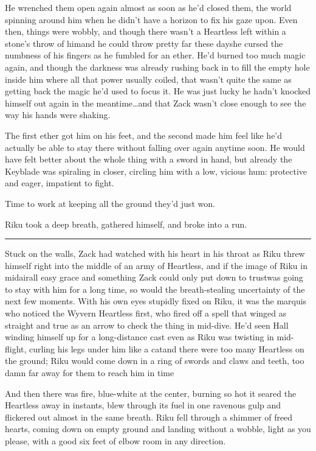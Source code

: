 He wrenched them open again almost as soon as he'd closed them, the world spinning around him when he didn't have a horizon to fix his gaze upon. Even then, things were wobbly, and though there wasn't a Heartless left within a stone's throw of him\textemdash and he could throw pretty far these days\textemdash he cursed the numbness of his fingers as he fumbled for an ether. He'd burned too much magic again, and though the darkness was already rushing back in to fill the empty hole inside him where all that power usually coiled, that wasn't quite the same as getting back the magic he'd used to focus it. He was just lucky he hadn't knocked himself out again in the meantime\ldots and that Zack wasn't close enough to see the way his hands were shaking.

The first ether got him on his feet, and the second made him feel like he'd actually be able to stay there without falling over again anytime soon. He would have felt better about the whole thing with a sword in hand, but already the Keyblade was spiraling in closer, circling him with a low, vicious hum: protective and eager, impatient to fight.

Time to work at keeping all the ground they'd just won.

Riku took a deep breath, gathered himself, and broke into a run.

\fancybreak{\pfbreakdisplay}


Stuck on the walls, Zack had watched with his heart in his throat as Riku threw himself right into the middle of an army of Heartless, and if the image of Riku in midair\textemdash all easy grace and something Zack could only put down to trust\textemdash was going to stay with him for a long time, so would the breath-stealing uncertainty of the next few moments. With his own eyes stupidly fixed on Riku, it was the marquis who noticed the Wyvern Heartless first, who fired off a spell that winged as straight and true as an arrow to check the thing in mid-dive. He'd seen Hall winding himself up for a long-distance cast even as Riku was twisting in mid-flight, curling his legs under him like a cat\textemdash and there were too many Heartless on the ground; Riku would come down in a ring of swords and claws and teeth, too damn far away for them to reach him in time\textemdash 

And then there was fire, blue-white at the center, burning so hot it seared the Heartless away in instants, blew through its fuel in one ravenous gulp and flickered out almost in the same breath. Riku fell through a shimmer of freed hearts, coming down on empty ground and landing without a wobble, light as you please, with a good six feet of elbow room in any direction.


